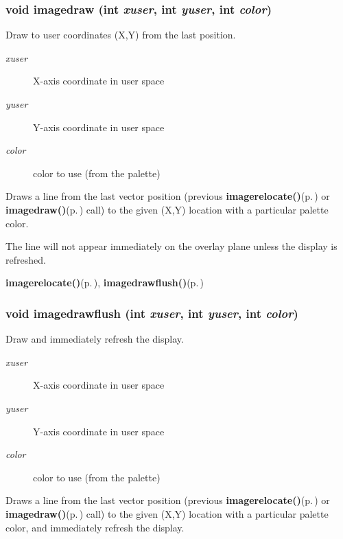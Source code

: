 \subsubsection{\setlength{\rightskip}{0pt plus 5cm}void imagedraw (int {\em xuser}, int {\em yuser}, int {\em color})}\label{xtv_8h_a73}


Draw to user coordinates (X,Y) from the last position. 

\begin{Desc}
\item[Parameters:]
\begin{description}
\item[{\em xuser}]X-axis coordinate in user space \item[{\em yuser}]Y-axis coordinate in user space \item[{\em color}]color to use (from the palette)\end{description}
\end{Desc}
Draws a line from the last vector position (previous {\bf imagerelocate()}{\rm (p.\,\pageref{xtv_8h_a72})} or {\bf imagedraw()}{\rm (p.\,\pageref{xtv_8h_a73})} call) to the given (X,Y) location with a particular palette color.

The line will not appear immediately on the overlay plane unless the display is refreshed.

\begin{Desc}
\item[See also:]{\bf imagerelocate()}{\rm (p.\,\pageref{xtv_8h_a72})}, {\bf imagedrawflush()}{\rm (p.\,\pageref{xtv_8h_a74})} \end{Desc}
\subsubsection{\setlength{\rightskip}{0pt plus 5cm}void imagedrawflush (int {\em xuser}, int {\em yuser}, int {\em color})}\label{xtv_8h_a74}


Draw and immediately refresh the display. 

\begin{Desc}
\item[Parameters:]
\begin{description}
\item[{\em xuser}]X-axis coordinate in user space \item[{\em yuser}]Y-axis coordinate in user space \item[{\em color}]color to use (from the palette)\end{description}
\end{Desc}
Draws a line from the last vector position (previous {\bf imagerelocate()}{\rm (p.\,\pageref{xtv_8h_a72})} or {\bf imagedraw()}{\rm (p.\,\pageref{xtv_8h_a73})} call) to the given (X,Y) location with a particular palette color, and immediately refresh the display.

